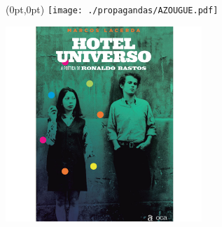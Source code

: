 \pagestyle{azougue}
\label{azougue}


\begin{textblock*}{5.625in}(0pt,0pt)%
\vspace*{-3.5cm}
\hspace*{-2.77cm}\texttt{[image: ./propagandas/AZOUGUE.pdf]}
\end{textblock*}

\pagebreak

%
%
%
%
%
%
%

\begin{center}
\hspace*{.5cm}\includegraphics[width=74mm]{./grid/hotel.jpg}
\end{center}

